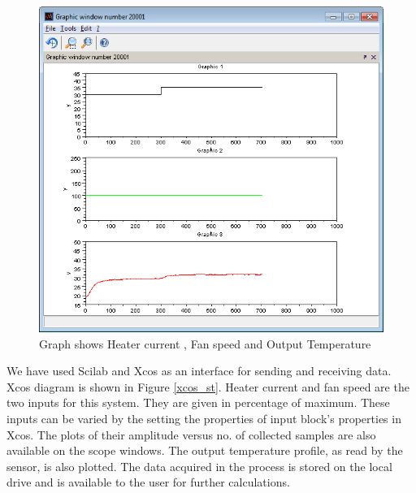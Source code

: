 \begin{figure}
\centering
\includegraphics[width=\linewidth]{Step-test_manual/step_graph.png}
\caption{Graph shows Heater current , Fan speed and Output Temperature}
\label{fig:scope_st}
\end{figure}
We have used Scilab and Xcos as an interface for sending and receiving data. Xcos diagram is shown in Figure \ref{xcos_st}. Heater current and fan speed are the two inputs for this system. They are given in percentage of maximum. These inputs can be varied by the setting the properties of input block's properties in Xcos. The plots of their amplitude versus no. of collected samples are also available on the scope windows. The output temperature profile, as read by the sensor, is also plotted. The data acquired in the process is stored on the local drive and is available to the user for further calculations.

